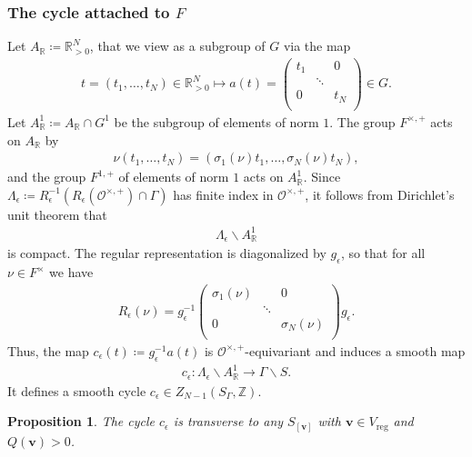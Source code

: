 \documentclass[twoside,a4paper,10pt]{article} %
\newcommand{\8}{\infty}
\newcommand{\Z}{\mathbb{Z}}
\newcommand{\vbf}{\mathbf{v}}
\newcommand{\R}{\mathbb{R}}
\newcommand{\reg}{\mathrm{reg}}
\newcommand{\Ocal}{\mathcal{O}}
\theoremstyle{mytheoremstyle}
\newtheorem{prop}[thm]{Proposition}
\theoremstyle{remark}
\numberwithin{equation}{section}
\begin{document}
\subsubsection{The cycle attached to $F$} Let $A_\R \coloneqq \R_{>0}^N$, that we view as a subgroup of $G$ via the map
\begin{align}
t=(t_1, \dots,t_N) \in \R_{>0}^N \longmapsto a(t)=\begin{pmatrix} t_1 &  & 0 \\  & \ddots &  \\ 0 &  & t_N \\ \end{pmatrix} \in G.
\end{align}Let $A^1_\R \coloneqq A_\R \cap G^1$ be the subgroup of elements of norm $1$.  The group $F^{\times,+}$ acts on $A_\R$ by 
\begin{align}
\nu (t_1, \dots,t_N)=(\sigma_1(\nu)t_1, \dots, \sigma_N(\nu)t_N),
\end{align}
and the group $F^{1,+}$ of elements of norm $1$ acts on $A^1_\R$. Since $\Lambda_\epsilon\coloneqq R_\epsilon^{-1}(R_\epsilon(\Ocal^{\times,+}) \cap \Gamma)$ has finite index in $\Ocal^{\times,+}$, it follows from Dirichlet's unit theorem that
\begin{align}
\Lambda_\epsilon \backslash A^1_\R
\end{align}
is compact.
The regular representation is diagonalized by $g_{\epsilon}$, so that for all $\nu \in F^\times$ we have
\begin{align}
R_\epsilon(\nu)=g^{-1}_{\epsilon}\begin{pmatrix} \sigma_1(\nu) &  & 0 \\  & \ddots &  \\ 0 &  & \sigma_N(\nu) \\ \end{pmatrix}g_{\epsilon}.
\end{align}
Thus, the map $c_\epsilon(t) \coloneqq g_{\epsilon}^{-1}a(t)$ is $\Ocal^{\times,+}$-equivariant and induces a smooth map
\begin{align}
c_\epsilon \colon \Lambda_\epsilon \backslash A^1_\R \longrightarrow \Gamma \backslash S.
\end{align}
It defines a smooth cycle $c_\epsilon \in Z_{N-1}(S_\Gamma,\Z)$.
\begin{prop} The cycle $c_\epsilon$ is transverse to any $S_{[\vbf]}$ with $\vbf \in V_\reg$ and $Q(\vbf) > 0$. 
\end{prop}
\end{document}
